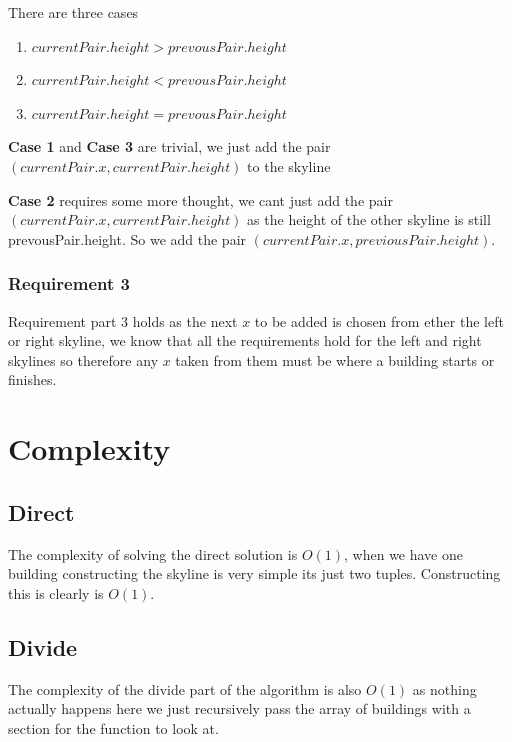 \documentclass{article}
\begin{document}
			There are three cases
			\begin{enumerate}
				\item $currentPair.height > prevousPair.height$
				\item $currentPair.height < prevousPair.height$
				\item $currentPair.height = prevousPair.height$
			\end{enumerate}
			
			\textbf{Case 1} and \textbf{Case 3} are trivial, we just add the pair $(currentPair.x, currentPair.height)$ to the skyline\newline
			
			\textbf{Case 2} requires some more thought, we cant just add the pair $(currentPair.x, currentPair.height)$ as the height of the other skyline is still prevousPair.height. So we add the pair $(currentPair.x, previousPair.height)$.
			
			\subsubsection{Requirement 3}
				Requirement part 3 holds as the next $x$ to be added is chosen from ether the left or right skyline, we know that all the requirements hold for the left and right skylines so therefore any $x$ taken from them must be where a building starts or finishes.
	
	\section{Complexity}
	
		\subsection{Direct}
	
		The complexity of solving the direct solution is $O(1)$, when we have one building constructing the skyline is very simple its just two tuples. Constructing this is clearly is $O(1)$.\newline		
		
		\subsection{Divide}		
		
		The complexity of the divide part of the algorithm is also $O(1)$ as nothing actually happens here we just recursively pass the array of buildings with a section for the function to look at.\newline
		
\end{document}
